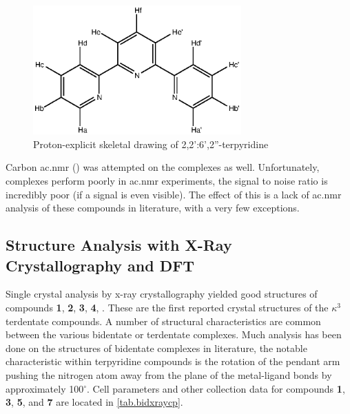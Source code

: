 \begin{figure}[!htbp]
 \begin{center}
  \includegraphics[clip=true, width=80mm, keepaspectratio]{images/expandedterpyridine.eps}
 \end{center}
\caption[Proton-explicit skeletal drawing of 2,2':6',2''-terpyridine]{Proton-explicit skeletal drawing of 2,2':6',2''-terpyridine}
\label{fig.terpynmr}
\end{figure} 

Carbon \gls{ac.nmr} () was attempted on the complexes as well. Unfortunately,  complexes perform poorly in  \gls{ac.nmr} experiments, the signal to noise ratio is incredibly poor (if a signal is even visible). The effect of this is a lack of  \gls{ac.nmr} analysis of these compounds in literature, with a very few exceptions. 

\subsection{Structure Analysis with X-Ray Crystallography and DFT} \label{ss.xray}

Single crystal analysis by x-ray crystallography yielded good structures of compounds \textbf{1}, \textbf{2}, \textbf{3}, \textbf{4}, . These are the first reported crystal structures of the $\kappa ^3$ terdentate  compounds. A number of structural characteristics are common between the various bidentate or terdentate complexes. Much analysis has been done on the structures of bidentate complexes in literature, the notable characteristic within terpyridine compounds is the rotation of the pendant arm pushing the nitrogen atom away from the plane of the metal-ligand bonds by approximately 100$^\circ$. Cell parameters and other collection data for compounds \textbf{1}, \textbf{3}, \textbf{5}, and \textbf{7} are located in \autoref{tab.bidxraycp}.

